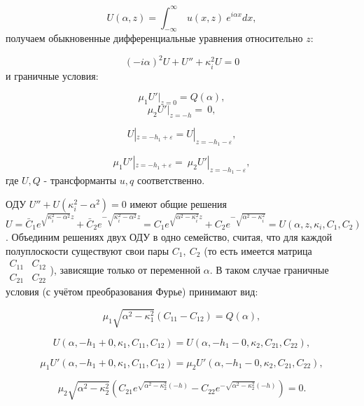 \documentclass[a4paper, 12pt]{article}
\begin{document}
$$U(\alpha,z)=\int_{-\infty}^{\infty}\ u(x,z) \ e^{i\alpha x} dx,$$
получаем обыкновенные дифференциальные уравнения относительно $z$:

$$(-i\alpha)^2 U+U''+\kappa_i^2U=0$$
и граничные условия:

$$\mu_1 U'|_{z=0}=Q(\alpha),$$
$$\mu_2  U'|_{z=-h}=\ 0,$$

$$ U|_{z=-h_1+\varepsilon}=U|_{z=-h_1-\varepsilon},$$

$$\mu_1  U'|_{z=-h_1+\varepsilon}=\ \mu_2  U'|_{z=-h_1-\varepsilon},$$
где $U, Q$ - трансформанты $u, q$ соответственно.

ОДУ $U'' +U (\kappa_i^2-\alpha^2)=0$ имеют общие решения $U=\bar C_1 e^{\sqrt{\kappa_i^2-\alpha^2} z} + \bar C_2 e^{-\sqrt{\kappa_i^2-\alpha^2} z}=C_1 e^{\sqrt{\alpha^2-\kappa_i^2} z} + C_2e^{-\sqrt{\alpha^2-\kappa_i^2}}=U(\alpha,z,\kappa_i,C_1,C_2)$. Объединим решениях двух ОДУ в одно семейство, считая, что для каждой полуплоскости существуют свои пары $C_1,\ C_2$ (то есть имеется матрица $\begin{matrix} C_{11} & C_{12} \\ C_{21} & C_{22} \end{matrix}$), зависящие только от переменной $\alpha$. В таком случае граничные условия (с учётом преобразования Фурье) принимают вид:

$$\mu_1 \sqrt{\alpha^2-\kappa_1^2} (C_{11}-C_{12})=Q(\alpha),$$

$$U(\alpha,-h_1+0,\kappa_1,C_{11},C_{12}) = U(\alpha,-h_1-0,\kappa_2,C_{21},C_{22}),$$

$$\mu_1 U'(\alpha,-h_1+0,\kappa_1,C_{11},C_{12}) =\mu_2 U'(\alpha,-h_1-0,\kappa_2,C_{21},C_{22}),$$

$$\mu_2 \sqrt{\alpha^2-\kappa_2^2} (C_{21} e^{\sqrt{\alpha^2-\kappa_2^2}(-h)}-C_{22}e^{-\sqrt{\alpha^2-\kappa_2^2}(-h)})=0 .$$
\end{document}
